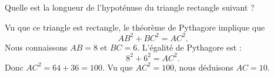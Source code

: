 \begin{example}
    Quelle est la longueur de l'hypoténuse du triangle rectangle suivant ?
    \begin{center}
        
    \end{center}
    Vu que ce triangle est rectangle, le théorème de Pythagore implique que
    \begin{equation}
        AB^2+BC^2=AC^2.
    \end{equation}
    Nous connaissons \( AB=8\) et \( BC=6\). L'égalité de Pythagore est :
    \begin{equation}
        8^2+6^2=AC^2.
    \end{equation}
    Donc \( AC^2=64+36=100\). Vu que \( AC^2=100\), nous déduisons \( AC=10\).
\end{example}
